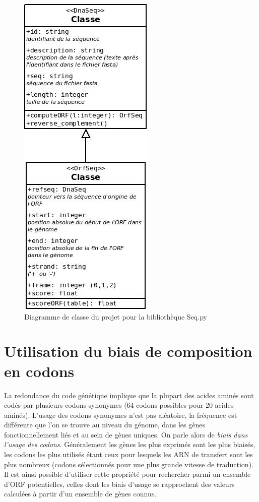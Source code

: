 \documentclass[10pt]{article}
\begin{document}
\begin{figure}[H]
    \centering
    \includegraphics[scale=0.6]{Diagramme_UML_v1.jpeg}
    \caption{Diagramme de classe du projet pour la bibliothèque Seq.py}
    \label{fig:class_diag}
\end{figure}

\section{Utilisation du biais de composition en codons}

La redondance du code génétique implique que la plupart des acides aminés sont codés par plusieurs codons synonymes (64 codons possibles pour 20 acides aminés). L’usage des codons synonymes n’est pas aléatoire, la fréquence est différente que l’on se trouve au niveau du génome, dans les gènes fonctionnellement liés et au sein de gènes uniques. On parle alors de {\em biais dans l'usage des codons}. Généralement les gènes les plus exprimés sont les plus biaisés, les codons les plus utilisés étant ceux pour lesquels les ARN de transfert sont les plus nombreux (codons sélectionnés pour une plus grande vitesse de traduction).
Il est ainsi possible d’utiliser cette propriété pour rechercher parmi un ensemble d’ORF potentielles, celles dont les biais d’usage se rapprochent des valeurs calculées à partir d’un ensemble de gènes connus.
\end{document}

